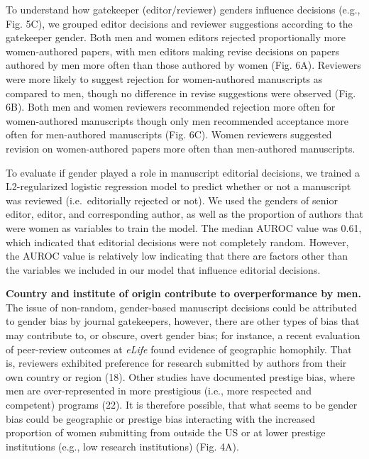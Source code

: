 \documentclass[11pt,]{article}
\begin{document}
To understand how gatekeeper (editor/reviewer) genders influence
decisions (e.g., Fig. 5C), we grouped editor decisions and reviewer
suggestions according to the gatekeeper gender. Both men and women
editors rejected proportionally more women-authored papers, with men
editors making revise decisions on papers authored by men more often
than those authored by women (Fig. 6A). Reviewers were more likely to
suggest rejection for women-authored manuscripts as compared to men,
though no difference in revise suggestions were observed (Fig. 6B). Both
men and women reviewers recommended rejection more often for
women-authored manuscripts though only men recommended acceptance more
often for men-authored manuscripts (Fig. 6C). Women reviewers suggested
revision on women-authored papers more often than men-authored
manuscripts.

To evaluate if gender played a role in manuscript editorial decisions,
we trained a L2-regularized logistic regression model to predict whether
or not a manuscript was reviewed (i.e.~editorially rejected or not). We
used the genders of senior editor, editor, and corresponding author, as
well as the proportion of authors that were women as variables to train
the model. The median AUROC value was 0.61, which indicated that
editorial decisions were not completely random. However, the AUROC value
is relatively low indicating that there are factors other than the
variables we included in our model that influence editorial decisions.

\textbf{Country and institute of origin contribute to overperformance by
men.} The issue of non-random, gender-based manuscript decisions could
be attributed to gender bias by journal gatekeepers, however, there are
other types of bias that may contribute to, or obscure, overt gender
bias; for instance, a recent evaluation of peer-review outcomes at
\emph{eLife} found evidence of geographic homophily. That is, reviewers
exhibited preference for research submitted by authors from their own
country or region (18). Other studies have documented prestige bias,
where men are over-represented in more prestigious (i.e., more respected
and competent) programs (22). It is therefore possible, that what seems
to be gender bias could be geographic or prestige bias interacting with
the increased proportion of women submitting from outside the US or at
lower prestige institutions (e.g., low research institutions) (Fig. 4A).
\end{document}
